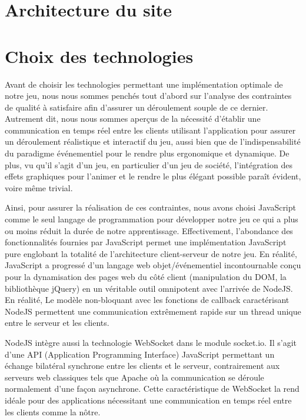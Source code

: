 \documentclass[12pt]{report}
\begin{document}
    \section{Architecture du site}

    \section{Choix des technologies}
		Avant de choisir les technologies permettant une implémentation optimale de notre jeu, nous nous sommes penchés tout d'abord sur l'analyse des contraintes de qualité à satisfaire afin d'assurer un déroulement souple de ce dernier. Autrement dit, nous nous sommes aperçus de la nécessité d'établir une communication en temps réel entre les clients utilisant l'application pour assurer un déroulement réalistique et interactif du jeu, aussi bien que de l'indispensabilité du paradigme événementiel pour le rendre plus ergonomique et dynamique. De plus, vu qu'il s'agit d'un jeu, en particulier d'un jeu de société, l'intégration des effets graphiques pour l'animer et le rendre le plus élégant possible paraît évident, voire même trivial.

		Ainsi, pour assurer la réalisation de ces contraintes, nous avons choisi JavaScript comme le seul langage de programmation pour développer notre jeu ce qui a plus ou moins réduit la durée de notre apprentissage. Effectivement, l'abondance des fonctionnalités fournies par JavaScript permet une implémentation JavaScript pure englobant la totalité de l'architecture client-serveur de notre jeu. En réalité, JavaScript a progressé d'un langage web objet/événementiel incontournable conçu pour la dynamisation des pages web du côté client (manipulation du DOM, la bibliothèque jQuery) en un véritable outil omnipotent avec l'arrivée de NodeJS. En réalité, Le modèle non-bloquant avec les fonctions de callback caractérisant NodeJS permettent une communication extrêmement rapide sur un thread unique entre le serveur et les clients.

		NodeJS intègre aussi la technologie WebSocket dans le module socket.io. Il s'agit d'une API (Application Programming Interface) JavaScript permettant un échange bilatéral synchrone entre les clients et le serveur, contrairement aux serveurs web classiques tels que Apache où la communication se déroule normalement d'une façon asynchrone. Cette caractéristique de WebSocket la rend idéale pour des applications nécessitant une communication en temps réel entre les clients comme la nôtre.
\end{document}

